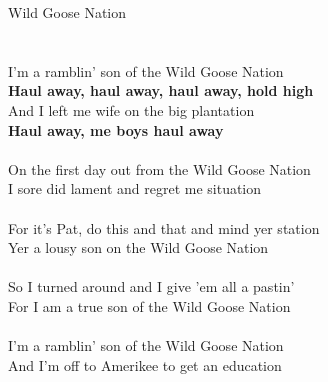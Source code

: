 \documentclass[letterpaper,9pt]{article}
\begin{document}
\newpage
{}
\huge
Wild Goose Nation\\
\\
\huge
\noindent
\\I'm a ramblin' son of the Wild Goose Nation
\\\textbf{Haul away, haul away, haul away, hold high}
\\And I left me wife on the big plantation
\\\textbf{Haul away, me boys haul away}
\\
\\On the first day out from the Wild Goose Nation
\\I sore did lament and regret me situation
\\
\\For it's Pat, do this and that and mind yer station
\\Yer a lousy son on the Wild Goose Nation
\\
\\So I turned around and I give 'em all a pastin'
\\For I am a true son of the Wild Goose Nation
\\
\\I'm a ramblin' son of the Wild Goose Nation
\\And I'm off to Amerikee to get an education
\end{document}

